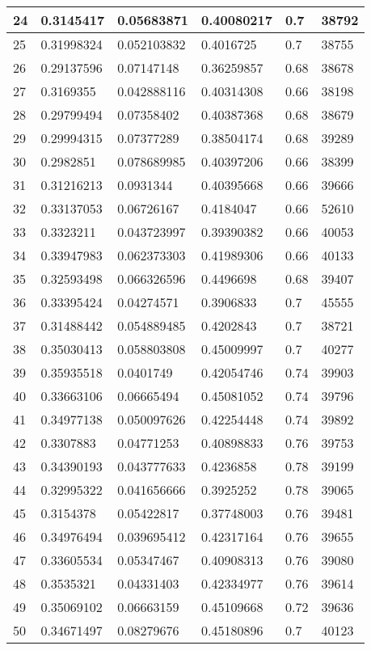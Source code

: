 \begin{longtable}{|l|l|l|l|l|l|}
24 & 0.3145417 & 0.05683871 & 0.40080217 & 0.7 & 38792 \\ \hline 
25 & 0.31998324 & 0.052103832 & 0.4016725 & 0.7 & 38755 \\ \hline 
26 & 0.29137596 & 0.07147148 & 0.36259857 & 0.68 & 38678 \\ \hline 
27 & 0.3169355 & 0.042888116 & 0.40314308 & 0.66 & 38198 \\ \hline 
28 & 0.29799494 & 0.07358402 & 0.40387368 & 0.68 & 38679 \\ \hline 
29 & 0.29994315 & 0.07377289 & 0.38504174 & 0.68 & 39289 \\ \hline 
30 & 0.2982851 & 0.078689985 & 0.40397206 & 0.66 & 38399 \\ \hline 
31 & 0.31216213 & 0.0931344 & 0.40395668 & 0.66 & 39666 \\ \hline 
32 & 0.33137053 & 0.06726167 & 0.4184047 & 0.66 & 52610 \\ \hline 
33 & 0.3323211 & 0.043723997 & 0.39390382 & 0.66 & 40053 \\ \hline 
34 & 0.33947983 & 0.062373303 & 0.41989306 & 0.66 & 40133 \\ \hline 
35 & 0.32593498 & 0.066326596 & 0.4496698 & 0.68 & 39407 \\ \hline 
36 & 0.33395424 & 0.04274571 & 0.3906833 & 0.7 & 45555 \\ \hline 
37 & 0.31488442 & 0.054889485 & 0.4202843 & 0.7 & 38721 \\ \hline 
38 & 0.35030413 & 0.058803808 & 0.45009997 & 0.7 & 40277 \\ \hline 
39 & 0.35935518 & 0.0401749 & 0.42054746 & 0.74 & 39903 \\ \hline 
40 & 0.33663106 & 0.06665494 & 0.45081052 & 0.74 & 39796 \\ \hline 
41 & 0.34977138 & 0.050097626 & 0.42254448 & 0.74 & 39892 \\ \hline 
42 & 0.3307883 & 0.04771253 & 0.40898833 & 0.76 & 39753 \\ \hline 
43 & 0.34390193 & 0.043777633 & 0.4236858 & 0.78 & 39199 \\ \hline 
44 & 0.32995322 & 0.041656666 & 0.3925252 & 0.78 & 39065 \\ \hline 
45 & 0.3154378 & 0.05422817 & 0.37748003 & 0.76 & 39481 \\ \hline 
46 & 0.34976494 & 0.039695412 & 0.42317164 & 0.76 & 39655 \\ \hline 
47 & 0.33605534 & 0.05347467 & 0.40908313 & 0.76 & 39080 \\ \hline 
48 & 0.3535321 & 0.04331403 & 0.42334977 & 0.76 & 39614 \\ \hline 
49 & 0.35069102 & 0.06663159 & 0.45109668 & 0.72 & 39636 \\ \hline 
50 & 0.34671497 & 0.08279676 & 0.45180896 & 0.7 & 40123 \\ \hline 
\end{longtable}